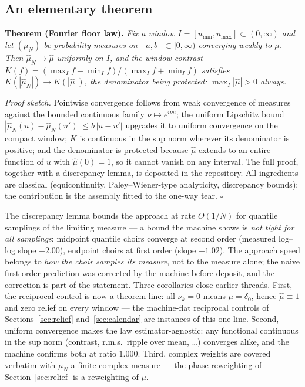 \documentclass[11pt,a4paper]{article}
\begin{document}
\subsection{An elementary theorem}
\label{sec:theorem}

\medskip\noindent\textbf{Theorem (Fourier floor law).}
\emph{Fix a window $I = [u_{\min}, u_{\max}] \subset (0,\infty)$ and let
$(\mu_N)$ be probability measures on $[a,b] \subset [0,\infty)$
converging weakly to $\mu$. Then $\hat{\mu}_N \to \hat{\mu}$ uniformly on
$I$, and the window-contrast
$K(f) = (\max_I f - \min_I f)/(\max_I f + \min_I f)$ satisfies
$K(|\hat{\mu}_N|) \to K(|\hat{\mu}|)$, the denominator being protected:
$\max_I |\hat{\mu}| > 0$ always.}

\medskip\noindent
\emph{Proof sketch.} Pointwise convergence follows from weak convergence
of measures against the bounded continuous family
$\nu \mapsto e^{i\nu u}$; the uniform Lipschitz bound
$|\hat{\mu}_N(u) - \hat{\mu}_N(u')| \le b\,|u - u'|$ upgrades it to
uniform convergence on the compact window; $K$ is continuous in the sup
norm wherever its denominator is positive; and the denominator is
protected because $\hat{\mu}$ extends to an entire function of $u$ with
$\hat{\mu}(0) = 1$, so it cannot vanish on any interval. The full proof,
together with a discrepancy lemma, is deposited in the repository. All
ingredients are classical (equicontinuity, Paley--Wiener-type
analyticity, discrepancy bounds); the contribution is the assembly
fitted to the one-way tear. \hfill$\square$

\medskip
The discrepancy lemma bounds the approach at rate $O(1/N)$ for quantile
samplings of the limiting measure --- a bound the machine shows is
\emph{not tight for all samplings}: midpoint quantile choirs converge at
second order (measured log--log slope $-2.00$), endpoint choirs at first
order (slope $-1.02$). The approach speed belongs to \emph{how the choir
samples its measure}, not to the measure alone; the naive first-order
prediction was corrected by the machine before deposit, and the
correction is part of the statement. Three corollaries close earlier
threads. First, the reciprocal control is now a theorem line: all
$\nu_k = 0$ means $\mu = \delta_0$, hence $\hat{\mu} \equiv 1$ and zero
relief on every window --- the machine-flat reciprocal controls of
Sections~\ref{sec:relief} and~\ref{sec:calendar} are instances of this
one line. Second, uniform convergence makes the law
estimator-agnostic: any functional continuous in the sup norm (contrast,
r.m.s.\ ripple over mean, \dots) converges alike, and the machine
confirms both at ratio $1.000$. Third, complex weights are covered
verbatim with $\mu_N$ a finite complex measure --- the phase reweighting
of Section~\ref{sec:relief} is a reweighting of $\mu$.
\end{document}
